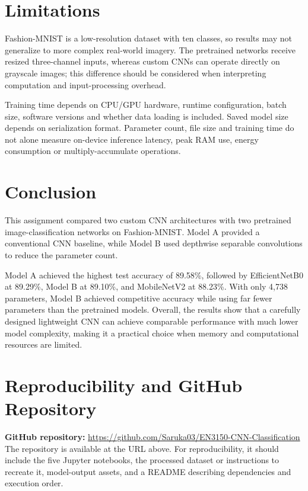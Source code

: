 \documentclass[12pt,a4paper]{article}
\begin{document}
\newpage
\section{Limitations}
Fashion-MNIST is a low-resolution dataset with ten classes, so results may not generalize to more complex real-world imagery. The pretrained networks receive resized three-channel inputs, whereas custom CNNs can operate directly on grayscale images; this difference should be considered when interpreting computation and input-processing overhead.

Training time depends on CPU/GPU hardware, runtime configuration, batch size, software versions and whether data loading is included. Saved model size depends on serialization format. Parameter count, file size and training time do not alone measure on-device inference latency, peak RAM use, energy consumption or multiply-accumulate operations.

\section{Conclusion}

This assignment compared two custom CNN architectures with two pretrained image-classification networks on Fashion-MNIST. Model A provided a conventional CNN baseline, while Model B used depthwise separable convolutions to reduce the parameter count.

Model A achieved the highest test accuracy of 89.58\%, followed by EfficientNetB0 at 89.29\%, Model B at 89.10\%, and MobileNetV2 at 88.23\%. With only 4,738 parameters, Model B achieved competitive accuracy while using far fewer parameters than the pretrained models. Overall, the results show that a carefully designed lightweight CNN can achieve comparable performance with much lower model complexity, making it a practical choice when memory and computational resources are limited.

\section{Reproducibility and GitHub Repository}
\textbf{GitHub repository:} \url{https://github.com/Saruka03/EN3150-CNN-Classification}\\
The repository is available at the URL above. For reproducibility, it should include the five Jupyter notebooks, the processed dataset or instructions to recreate it, model-output assets, and a README describing dependencies and execution order.
\end{document}
